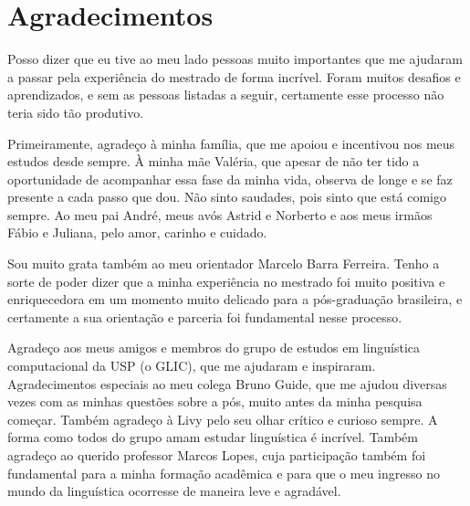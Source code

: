 \documentclass[12pt,twoside,a4paper]{book}
\begin{document}
\frontmatter 
\fancyhead[RO]{{\footnotesize\rightmark}\hspace{2em}\thepage}
\fancyhead[LE]{\thepage\hspace{2em}\footnotesize{\leftmark}}
\fancyhead[RE,LO]{}
\fancyhead[RO]{{\footnotesize\rightmark}\hspace{2em}\thepage}


\onehalfspacing  %


\makeatletter\@openrightfalse\makeatother
{}





\chapter*{Agradecimentos}

Posso dizer que eu tive ao meu lado pessoas muito importantes que me ajudaram a passar pela experiência do mestrado de forma incrível. Foram muitos desafios e aprendizados, e sem as pessoas listadas a seguir, certamente esse processo não teria sido tão produtivo. 

Primeiramente, agradeço à minha família, que me apoiou e incentivou nos meus estudos desde sempre. À minha mãe Valéria, que apesar de não ter tido a oportunidade de acompanhar essa fase da minha vida, observa de longe e se faz presente a cada passo que dou. Não sinto saudades, pois sinto que está comigo sempre. Ao meu pai André, meus avós Astrid e Norberto e aos meus irmãos Fábio e Juliana, pelo amor, carinho e cuidado.

Sou muito grata também ao meu orientador Marcelo Barra Ferreira. Tenho a sorte de poder dizer que a minha experiência no mestrado foi muito positiva e enriquecedora em um momento muito delicado para a pós-graduação brasileira, e certamente a sua orientação e parceria foi fundamental nesse processo.

Agradeço aos meus amigos e membros do grupo de estudos em linguística computacional da USP (o GLIC), que me ajudaram e inspiraram. Agradecimentos especiais ao meu colega Bruno Guide, que me ajudou diversas vezes com as minhas questões sobre a pós, muito antes da minha pesquisa começar. Também agradeço à Livy pelo seu olhar crítico e curioso sempre. A forma como todos do grupo amam estudar linguística é incrível. Também agradeço ao querido professor Marcos Lopes, cuja participação também foi fundamental para a minha formação acadêmica e para que o meu ingresso no mundo da linguística ocorresse de maneira leve e agradável.
\end{document}
